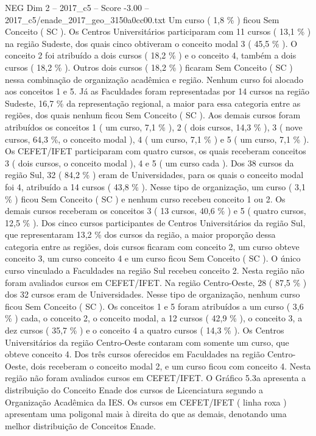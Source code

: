 \begin{textsample}{NEG Dim 2 – 2017\_c5 – Score -3.00 – 2017\_c5/enade\_2017\_geo\_3150a0cc00.txt}
Um curso ( 1,8 \% ) ficou Sem Conceito ( SC ).
Os Centros Universitários participaram com 11 cursos ( 13,1 \% ) na região Sudeste, dos quais cinco obtiveram o conceito modal 3 ( 45,5 \% ).
O conceito 2 foi atribuído a dois cursos ( 18,2 \% ) e o conceito 4, também a dois cursos ( 18,2 \% ).
Outros dois cursos ( 18,2 \% ) ficaram Sem Conceito ( SC ) nessa combinação de organização acadêmica e região.
Nenhum curso foi alocado aos conceitos 1 e 5.
Já as Faculdades foram representadas por 14 cursos na região Sudeste, 16,7 \% da representação regional, a maior para essa categoria entre as regiões, dos quais nenhum ficou Sem Conceito ( SC ).
Aos demais cursos foram atribuídos os conceitos 1 ( um curso, 7,1 \% ), 2 ( dois cursos, 14,3 \% ), 3 ( nove cursos, 64,3 \%, o conceito modal ), 4 ( um curso, 7,1 \% ) e 5 ( um curso, 7,1 \% ).
Os CEFET/IFET participaram com quatro cursos, os quais receberam conceitos 3 ( dois cursos, o conceito modal ), 4 e 5 ( um curso cada ).
Dos 38 cursos da região Sul, 32 ( 84,2 \% ) eram de Universidades, para os quais o conceito modal foi 4, atribuído a 14 cursos ( 43,8 \% ).
Nesse tipo de organização, um curso ( 3,1 \% ) ficou Sem Conceito ( SC ) e nenhum curso recebeu conceito 1 ou 2.
Os demais cursos receberam os conceitos 3 ( 13 cursos, 40,6 \% ) e 5 ( quatro cursos, 12,5 \% ).
Dos cinco cursos participantes de Centros Universitários da região Sul, que representaram 13,2 \% dos cursos da região, a maior proporção dessa categoria entre as regiões, dois cursos ficaram com conceito 2, um curso obteve conceito 3, um curso conceito 4 e um curso ficou Sem Conceito ( SC ).
O único curso vinculado a Faculdades na região Sul recebeu conceito 2.
Nesta região não foram avaliados cursos em CEFET/IFET.
Na região Centro-Oeste, 28 ( 87,5 \% ) dos 32 cursos eram de Universidades.
Nesse tipo de organização, nenhum curso ficou Sem Conceito ( SC ).
Os conceitos 1 e 5 foram atribuídos a um curso ( 3,6 \% ) cada, o conceito 2, o conceito modal, a 12 cursos ( 42,9 \% ), o conceito 3, a dez cursos ( 35,7 \% ) e o conceito 4 a quatro cursos ( 14,3 \% ).
Os Centros Universitários da região Centro-Oeste contaram com somente um curso, que obteve conceito 4.
Dos três cursos oferecidos em Faculdades na região Centro-Oeste, dois receberam o conceito modal 2, e um curso ficou com conceito 4.
Nesta região não foram avaliados cursos em CEFET/IFET.
O Gráfico 5.3a apresenta a distribuição do Conceito Enade dos cursos de Licenciatura segundo a Organização Acadêmica da IES.
Os cursos em CEFET/IFET ( linha roxa ) apresentam uma poligonal mais à direita do que as demais, denotando uma melhor distribuição de Conceitos Enade.

\end{textsample}
